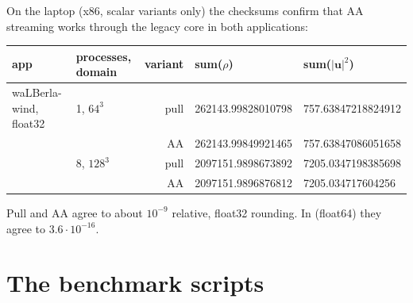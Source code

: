 On the laptop (x86, scalar variants only) the checksums confirm that AA streaming works
through the legacy core in both applications:
\begin{center}\small
\begin{tabular}{@{}llrll@{}}
  \toprule
  \textbf{app} & \textbf{processes, domain} & \textbf{variant} & \textbf{sum($\rho$)} &
    \textbf{sum($|\mathbf{u}|^2$)}\\
  \midrule
  waLBerla-wind, float32 & 1, $64^3$ & pull & 262143.99828010798 & 757.63847218824912\\
   & & AA & 262143.99849921465 & 757.63847086051658\\
   & 8, $128^3$ & pull & 2097151.9898673892 & 7205.0347198385698\\
   & & AA & 2097151.9896876812 & 7205.034717604256\\
  \bottomrule
\end{tabular}
\end{center}
Pull and AA agree to about $10^{-9}$ relative, float32 rounding. In
 (float64) they agree to $3.6\cdot10^{-16}$.

\section{The benchmark scripts}\label{r04:sec:scripts}

